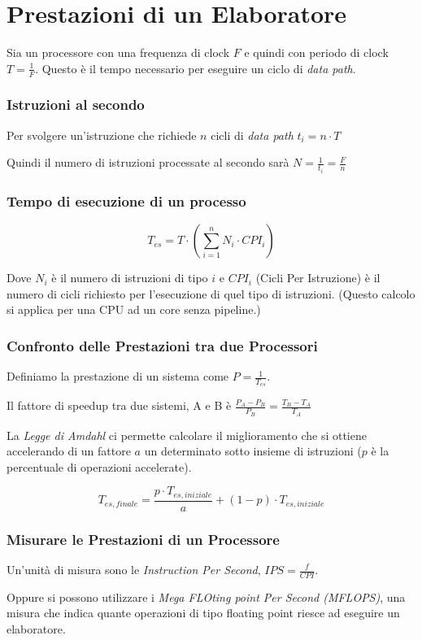 \section{Prestazioni di un Elaboratore}

Sia un processore con una frequenza di clock $F$ e quindi con periodo di clock $T = \frac{1}{F}$. Questo è il tempo necessario per eseguire un ciclo di \textit{data path}.

\subsubsection*{Istruzioni al secondo}
Per svolgere un'istruzione che richiede $n$ cicli di \textit{data path} $t_{i} = n \cdot T$

Quindi il numero di istruzioni processate al secondo sarà $N = \frac{1}{t_{i}} = \frac{F}{n}$

\subsubsection*{Tempo di esecuzione di un processo}
$$T_{es} = T \cdot (\sum_{i=1}^n N_i \cdot CPI_i )$$

Dove $N_i$ è il numero di istruzioni di tipo $i$ e $CPI_i$ (Cicli Per Istruzione) è il numero di cicli richiesto per l'esecuzione di quel tipo di istruzioni.
(Questo calcolo si applica per una CPU ad un core senza pipeline.)

\subsubsection*{Confronto delle Prestazioni tra due Processori}
Definiamo la prestazione di un sistema come $P = \frac{1}{T_{es}}$.

Il fattore di speedup tra due sistemi, A e B è $\frac{P_A - P_B}{P_B} = \frac{T_B - T_A}{T_A}$

\spacer
La \textit{Legge di Amdahl} ci permette calcolare il miglioramento che si ottiene accelerando di un fattore $a$ un determinato sotto insieme di istruzioni ($p$ è la percentuale di operazioni accelerate).

$$T_{es, finale} = \frac{p \cdot T_{es, iniziale}}{a} + (1-p) \cdot T_{es, iniziale}$$

\subsubsection*{Misurare le Prestazioni di un Processore}
Un'unità di misura sono le \textit{Instruction Per Second}, $IPS = \frac{f}{CPI}$.

Oppure si possono utilizzare i \textit{Mega FLOting point Per Second (MFLOPS)}, una misura che indica quante operazioni di tipo floating point riesce ad eseguire un elaboratore.
